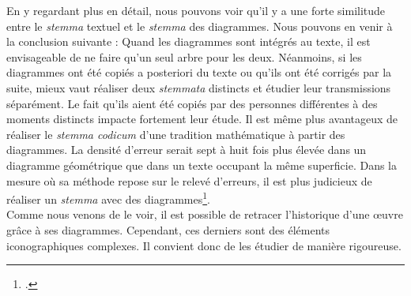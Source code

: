 En y regardant plus en détail, nous pouvons voir qu'il y a une forte similitude entre le \textit{stemma} textuel et le \textit{stemma} des diagrammes. Nous pouvons en venir à la conclusion suivante : Quand les diagrammes sont intégrés au texte, il est envisageable de ne faire qu'un seul arbre pour les deux. Néanmoins, si les diagrammes ont été copiés a posteriori du texte ou qu'ils ont été corrigés par la suite, mieux vaut réaliser deux \textit{stemmata} distincts et étudier leur transmissions séparément. Le fait qu'ils aient été copiés par des personnes différentes à des moments distincts impacte fortement leur étude. Il est même plus avantageux de réaliser le \textit{stemma codicum} d'une tradition mathématique à partir des diagrammes. La densité d'erreur serait sept à huit fois plus élevée dans un diagramme géométrique que dans un texte occupant la même superficie. Dans la mesure où sa méthode repose sur le relevé d'erreurs, il est plus judicieux de réaliser un \textit{stemma} avec des diagrammes\footcite{raynaudBuildingStemmaCodicum2014}.\\

Comme nous venons de le voir, il est possible de retracer l'historique d'une œuvre grâce à ses diagrammes. Cependant, ces derniers sont des éléments iconographiques complexes. Il convient donc de les étudier de manière rigoureuse.